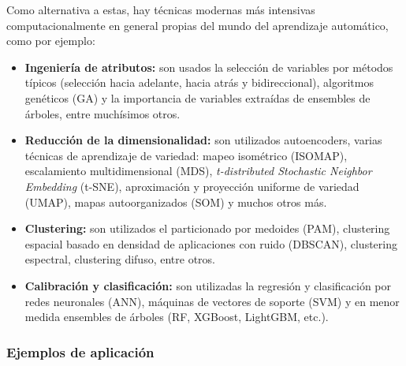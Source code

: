 \documentclass[12pt]{article}
\begin{document}
Como alternativa a estas, hay técnicas modernas más intensivas computacionalmente en general propias del mundo del aprendizaje automático, como por ejemplo\cite{ML}\cite{GA}\cite{PCA-SVM}\cite{MULT}\cite{CLUST}\cite{SOM}\cite{EMSLIBS2019}:

\begin{itemize}
    \item \textbf{Ingeniería de atributos:} son usados la selección de variables por métodos típicos (selección hacia adelante, hacia atrás y bidireccional), algoritmos genéticos (GA) y la importancia de variables extraídas de ensembles de árboles, entre muchísimos otros.
    \item \textbf{Reducción de la dimensionalidad:} son utilizados autoencoders, varias técnicas de aprendizaje de variedad: mapeo isométrico (ISOMAP), escalamiento multidimensional (MDS), \textit{t-distributed Stochastic Neighbor Embedding} (t-SNE), aproximación y proyección uniforme de variedad (UMAP), mapas autoorganizados (SOM) y muchos otros más.
    \item \textbf{Clustering:} son utilizados el particionado por medoides (PAM), clustering espacial basado en densidad de aplicaciones con ruido (DBSCAN), clustering espectral, clustering difuso, entre otros.
    \item \textbf{Calibración y clasificación:} son utilizadas la regresión y clasificación por redes neuronales (ANN), máquinas de vectores de soporte (SVM) y en menor medida ensembles de árboles (RF, XGBoost, LightGBM, etc.).
\end{itemize}

\subsubsection{Ejemplos de aplicación}
\end{document}
